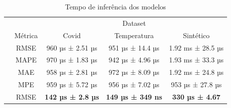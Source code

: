 \begin{table}[!htp]
    \caption{Tempo de inferência dos modelos}
    \setlength\extrarowheight{5pt}
    \begin{tabular}{|c|c|ccc|}
        \hline
        \rowcolor[HTML]{C0C0C0}
        \cellcolor[HTML]{C0C0C0}                          & \cellcolor[HTML]{C0C0C0}                          & \multicolumn{3}{c|}{\cellcolor[HTML]{C0C0C0}Dataset}                                                                                                                         \\ \cline{3-5}
        \rowcolor[HTML]{C0C0C0}
        \multirow{-2}{*}{\cellcolor[HTML]{C0C0C0}Modelo}  & \multirow{-2}{*}{\cellcolor[HTML]{C0C0C0}Métrica} & \multicolumn{1}{c|}{\cellcolor[HTML]{C0C0C0}Covid}                      & \multicolumn{1}{c|}{\cellcolor[HTML]{C0C0C0}Temperatura}               & Sintético                 \\ \hline
        \cellcolor[HTML]{C0C0C0}                          & RMSE                                              & \multicolumn{1}{c|}{960 µs ± 2.51 µs}                                   & \multicolumn{1}{c|}{951 µs ± 14.4 µs}                                  & 1.92 ms ± 28.5 µs         \\ \cline{2-5}
        \rowcolor[HTML]{EFEFEF}
        \cellcolor[HTML]{C0C0C0}                          & MAPE                                              & \multicolumn{1}{c|}{\cellcolor[HTML]{EFEFEF}970 µs ± 1.83 µs}           & \multicolumn{1}{c|}{\cellcolor[HTML]{EFEFEF}942 µs ± 4.96 µs}          & 1.93 ms ± 33.3 µs         \\ \cline{2-5}
        \cellcolor[HTML]{C0C0C0}                          & MAE                                               & \multicolumn{1}{c|}{958 µs ± 2.81 µs}                                   & \multicolumn{1}{c|}{972 µs ± 8.09 µs}                                  & 1.92 ms ± 24.8 µs         \\ \cline{2-5}
        \rowcolor[HTML]{EFEFEF}
        \multirow{-4}{*}{\cellcolor[HTML]{C0C0C0}ARIMA}   & MPE                                               & \multicolumn{1}{c|}{\cellcolor[HTML]{EFEFEF}959 µs ± 5.72 µs}           & \multicolumn{1}{c|}{\cellcolor[HTML]{EFEFEF}956 µs ± 7.02 µs}          & 953 µs ± 27.8 µs          \\ \hline
        \cellcolor[HTML]{C0C0C0}                          & RMSE                                              & \multicolumn{1}{c|}{\textbf{142 µs ± 2.8 µs}}                           & \multicolumn{1}{c|}{\textbf{149 µs ± 349 ns}}                          & \textbf{330 µs ± 4.67}    \\ \cline{2-5}

\end{tabular}
\end{table}
